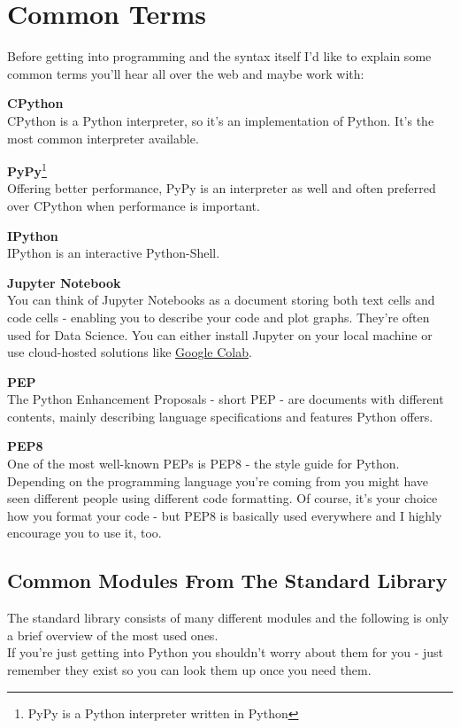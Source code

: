 \section{Common Terms}
    Before getting into programming and the syntax itself I'd like to explain some common terms
    you'll hear all over the web and maybe work with:

    \textbf{CPython} \\
    CPython is a Python interpreter, so it's an implementation of Python.
    It's the most common interpreter available.

    \textbf{PyPy}\footnote{PyPy is a Python interpreter written in Python} \\
    Offering better performance, PyPy is an interpreter as well and often preferred over CPython
    when performance is important.

    \textbf{IPython} \\
    IPython is an interactive Python-Shell.

    \textbf{Jupyter Notebook} \\
    You can think of Jupyter Notebooks as a document storing both text cells and code cells -
    enabling you to describe your code and plot graphs. They're often used for Data Science.
    You can either install Jupyter on your local machine or use cloud-hosted solutions like
    \href{https://colab.research.google.com/}{Google Colab}.

    \textbf{PEP} \\
    The Python Enhancement Proposals - short PEP - are documents with different contents, mainly
    describing language specifications and features Python offers.

    \textbf{PEP8} \\
    One of the most well-known PEPs is PEP8 - the style guide for Python. \\
    Depending on the programming language you're coming from you might have seen different people
    using different code formatting.
    Of course, it's your choice how you format your code - but PEP8 is basically used everywhere and
    I highly encourage you to use it, too.

    \subsection{Common Modules From The Standard Library}
        The standard library consists of many different modules and the following is only a brief
        overview of the most used ones.\\
        If you're just getting into Python you shouldn't worry about them for you - just remember
        they exist so you can look them up once you need them.

